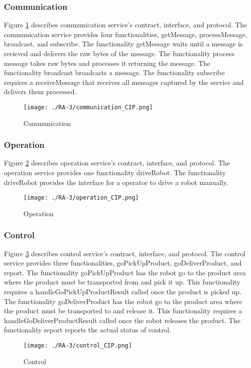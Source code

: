 \subsubsection{Communication} %
Figure \ref{fig:communication_cip} describes communication service's contract, interface, and protocol. The communication service provides four functionalities, getMessage, processMessage, broadcast, and subscribe. The functionality getMessage waits until a message is recieved and delivers the raw bytes of the message. The functionality process message takes raw bytes and processes it returning the message. The functionality broadcast broadcasts a message. The functionality subscribe requires a receiveMessage that receives all messages captured by the service and delivers them processed.
\begin{figure}[ht!]
 \centering
 \texttt{[image: ./RA-3/communication\_CIP.png]}
 \caption{Communication}
 \label{fig:communication_cip}
\end{figure}

\subsubsection{Operation} %
Figure \ref{fig:operation_cip} describes operation service's contract, interface, and protocol. The operation service provides one functionality driveRobot. The functionality driveRobot provides the interface for a operator to drive a robot manually.
\begin{figure}[ht!]
 \centering
 \texttt{[image: ./RA-3/operation\_CIP.png]}
 \caption{Operation}
 \label{fig:operation_cip}
\end{figure}

\subsubsection{Control} %
Figure \ref{fig:control_cip} describes control service's contract, interface, and protocol. The control service provides three functionalities, goPickUpProduct, goDeliverProduct, and report. The functionality goPickUpProduct has the robot go to the product area where the product must be transported from and pick it up. This functionality requires a handleGoPickUpProductResult called once the product is picked up. The functionality goDeliverProduct has the robot go to the product area where the product must be transported to and release it. This functionality requires a handleGoDeliverProductResult called once the robot releases the product. The functionality report reports the actual status of control.
\begin{figure}[ht!]
 \centering
 \texttt{[image: ./RA-3/control\_CIP.png]}
 \caption{Control}
 \label{fig:control_cip}
\end{figure}

